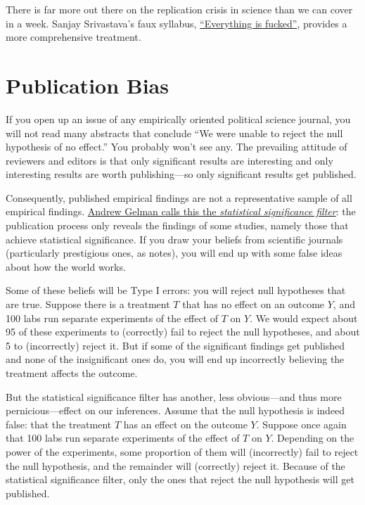 \documentclass[
  12pt,
  oneside,openany]{book}
\begin{document}
There is far more out there on the replication crisis in science than we can cover in a week. Sanjay Srivastava's faux syllabus, \href{https://hardsci.wordpress.com/2016/08/11/everything-is-fucked-the-syllabus/}{``Everything is fucked''}, provides a more comprehensive treatment.

\hypertarget{publication-bias}{%
\section{Publication Bias}\label{publication-bias}}

If you open up an issue of any empirically oriented political science journal, you will not read many abstracts that conclude ``We were unable to reject the null hypothesis of no effect.'' You probably won't see any. The prevailing attitude of reviewers and editors is that only significant results are interesting and only interesting results are worth publishing---so only significant results get published.

Consequently, published empirical findings are not a representative sample of all empirical findings. \href{http://andrewgelman.com/2011/09/10/the-statistical-significance-filter/}{Andrew Gelman calls this the \emph{statistical significance filter}}: the publication process only reveals the findings of some studies, namely those that achieve statistical significance. If you draw your beliefs from scientific journals (particularly prestigious ones, as \citet{ioannidis2008most} notes), you will end up with some false ideas about how the world works.

Some of these beliefs will be Type I errors: you will reject null hypotheses that are true. Suppose there is a treatment \(T\) that has no effect on an outcome \(Y\), and 100 labs run separate experiments of the effect of \(T\) on \(Y\). We would expect about 95 of these experiments to (correctly) fail to reject the null hypotheses, and about 5 to (incorrectly) reject it. But if some of the significant findings get published and none of the insignificant ones do, you will end up incorrectly believing the treatment affects the outcome.

But the statistical significance filter has another, less obvious---and thus more pernicious---effect on our inferences. Assume that the null hypothesis is indeed false: that the treatment \(T\) has an effect on the outcome \(Y\). Suppose once again that 100 labs run separate experiments of the effect of \(T\) on \(Y\). Depending on the power of the experiments, some proportion of them will (incorrectly) fail to reject the null hypothesis, and the remainder will (correctly) reject it. Because of the statistical significance filter, only the ones that reject the null hypothesis will get published.
\end{document}
